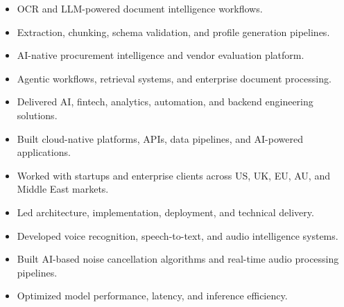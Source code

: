 \documentclass[10pt,a4paper,withhyper]{altacv}
\begin{document}
\divider


\begin{itemize}
\item OCR and LLM-powered document intelligence workflows.
\item Extraction, chunking, schema validation, and profile generation pipelines.
\end{itemize}

\divider


\begin{itemize}
\item AI-native procurement intelligence and vendor evaluation platform.
\item Agentic workflows, retrieval systems, and enterprise document processing.
\end{itemize}





\begin{itemize}
\item Delivered AI, fintech, analytics, automation, and backend engineering solutions.
\item Built cloud-native platforms, APIs, data pipelines, and AI-powered applications.
\item Worked with startups and enterprise clients across US, UK, EU, AU, and Middle East markets.
\item Led architecture, implementation, deployment, and technical delivery.
\end{itemize}

\divider


\begin{itemize}
\item Developed voice recognition, speech-to-text, and audio intelligence systems.
\item Built AI-based noise cancellation algorithms and real-time audio processing pipelines.
\item Optimized model performance, latency, and inference efficiency.
\end{itemize}
\end{document}
